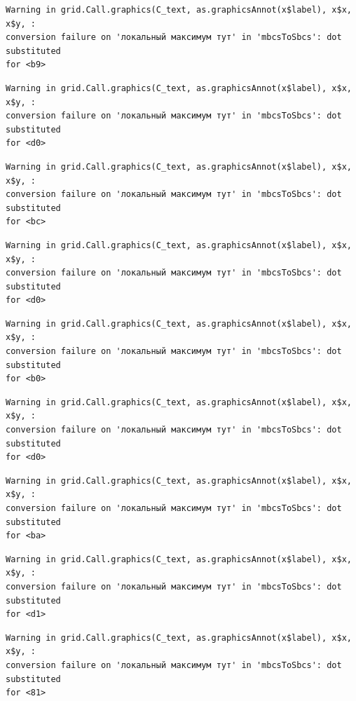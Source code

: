\documentclass[
  letterpaper,
]{scrbook}
\theoremstyle{definition}
\theoremstyle{remark}
\begin{document}
\begin{verbatim}
Warning in grid.Call.graphics(C_text, as.graphicsAnnot(x$label), x$x, x$y, :
conversion failure on 'локальный максимум тут' in 'mbcsToSbcs': dot substituted
for <b9>
\end{verbatim}

\begin{verbatim}
Warning in grid.Call.graphics(C_text, as.graphicsAnnot(x$label), x$x, x$y, :
conversion failure on 'локальный максимум тут' in 'mbcsToSbcs': dot substituted
for <d0>
\end{verbatim}

\begin{verbatim}
Warning in grid.Call.graphics(C_text, as.graphicsAnnot(x$label), x$x, x$y, :
conversion failure on 'локальный максимум тут' in 'mbcsToSbcs': dot substituted
for <bc>
\end{verbatim}

\begin{verbatim}
Warning in grid.Call.graphics(C_text, as.graphicsAnnot(x$label), x$x, x$y, :
conversion failure on 'локальный максимум тут' in 'mbcsToSbcs': dot substituted
for <d0>
\end{verbatim}

\begin{verbatim}
Warning in grid.Call.graphics(C_text, as.graphicsAnnot(x$label), x$x, x$y, :
conversion failure on 'локальный максимум тут' in 'mbcsToSbcs': dot substituted
for <b0>
\end{verbatim}

\begin{verbatim}
Warning in grid.Call.graphics(C_text, as.graphicsAnnot(x$label), x$x, x$y, :
conversion failure on 'локальный максимум тут' in 'mbcsToSbcs': dot substituted
for <d0>
\end{verbatim}

\begin{verbatim}
Warning in grid.Call.graphics(C_text, as.graphicsAnnot(x$label), x$x, x$y, :
conversion failure on 'локальный максимум тут' in 'mbcsToSbcs': dot substituted
for <ba>
\end{verbatim}

\begin{verbatim}
Warning in grid.Call.graphics(C_text, as.graphicsAnnot(x$label), x$x, x$y, :
conversion failure on 'локальный максимум тут' in 'mbcsToSbcs': dot substituted
for <d1>
\end{verbatim}

\begin{verbatim}
Warning in grid.Call.graphics(C_text, as.graphicsAnnot(x$label), x$x, x$y, :
conversion failure on 'локальный максимум тут' in 'mbcsToSbcs': dot substituted
for <81>
\end{verbatim}
\end{document}
